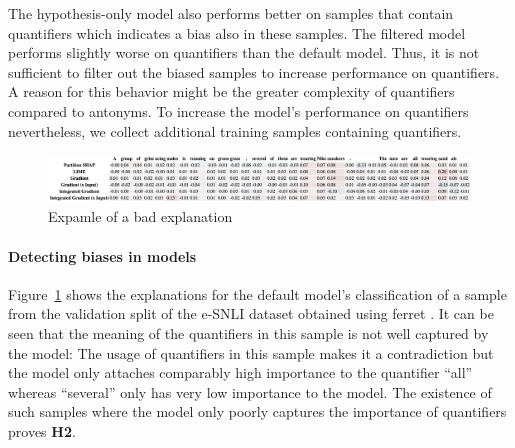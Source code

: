 The hypothesis-only model also performs better on samples that contain quantifiers which indicates a bias also in these samples. The filtered model performs slightly worse on quantifiers than the default model. Thus, it is not sufficient to filter out the biased samples to increase performance on quantifiers. A reason for this behavior might be the greater complexity of quantifiers compared to antonyms. To increase the model's performance on quantifiers nevertheless, we collect additional training samples containing quantifiers.

\begin{figure}[h!]
    \centering
    \includegraphics[width=\textwidth]{./images/ferret_sample.png}
    \caption{Expamle of a bad explanation}
    \label{fig:ferret-sample}
\end{figure}

\FloatBarrier{}

\paragraph{Detecting biases in models}
Figure~\ref{fig:ferret-sample} shows the explanations for the default model's classification of a sample from the validation split of the \ac{e-SNLI} dataset obtained using ferret \cite{ferret}. It can be seen that the meaning of the quantifiers in this sample is not well captured by the model: The usage of quantifiers in this sample makes it a contradiction but the model only attaches comparably high importance to the quantifier \enquote{all} whereas \enquote{several} only has very low importance to the model. The existence of such samples where the model only poorly captures the importance of quantifiers proves \textbf{H2}.
